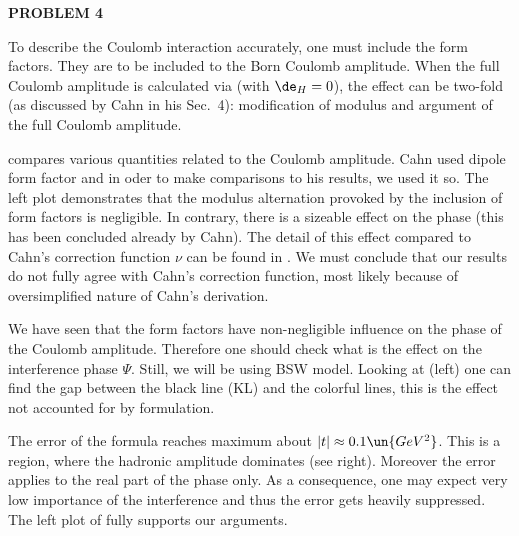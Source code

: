 
{\bf PROBLEM 4}

To describe the Coulomb interaction accurately, one must include the form factors. They are to be included to the Born Coulomb amplitude. When the full Coulomb amplitude is calculated via  (with $\de_H=0$), the effect can be two-fold (as discussed by Cahn in his Sec.~4): modification of modulus and argument of the full Coulomb amplitude. 

 compares various quantities related to the Coulomb amplitude. Cahn used dipole form factor and in oder to make comparisons to his results, we used it so. The left plot demonstrates that the modulus alternation provoked by the inclusion of form factors is negligible. In contrary, there is a sizeable effect on the phase (this has been concluded already by Cahn). The detail of this effect compared to Cahn's correction function $\nu$ can be found in . We must conclude that our results do not fully agree with Cahn's correction function, most likely because of oversimplified nature of Cahn's derivation.



We have seen that the form factors have non-negligible influence on the phase of the Coulomb amplitude. Therefore one should check what is the effect on the interference phase $\Psi$. Still, we will be using BSW model. Looking at  (left) one can find the gap between the black line (KL) and the colorful lines, this is the effect not accounted for by \KL{} formulation.


The error of the \KL{} formula reaches maximum about $|t|\approx 0.1\un{GeV^2}$. This is a region, where the hadronic amplitude dominates (see  right). Moreover the error applies to the real part of the phase only. As a consequence, one may expect very low importance of the interference and thus the error gets heavily suppressed. The left plot of  fully supports our arguments.

